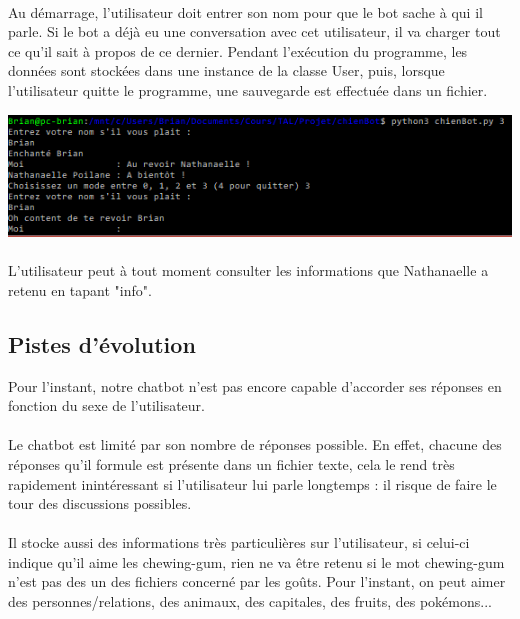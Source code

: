 \documentclass[paper=a4, fontsize=11pt]{article}
\begin{document}
\paragraph{} Au démarrage, l'utilisateur doit entrer son nom pour que le bot sache à qui il parle. Si le bot a déjà eu une conversation avec cet utilisateur, il va charger tout ce qu'il sait à propos de ce dernier. Pendant l'exécution du programme, les données sont stockées dans une instance de la classe User, puis, lorsque l'utilisateur quitte le programme, une sauvegarde est effectuée dans un fichier.
\begin{center}
\includegraphics{reload.PNG}
\end{center}
\paragraph{} 
\paragraph{} L'utilisateur peut à tout moment consulter les informations que Nathanaelle a retenu en tapant "info".

\subsection{Pistes d'évolution}

Pour l'instant, notre chatbot n'est pas encore capable d'accorder ses réponses en fonction du sexe de l'utilisateur.
\paragraph{} Le chatbot est limité par son nombre de réponses possible. En effet, chacune des réponses qu’il formule est présente dans un fichier texte, cela le rend très rapidement inintéressant si l’utilisateur lui parle longtemps : il risque de faire le tour des discussions possibles. 
\paragraph{} Il stocke aussi des informations très particulières sur l’utilisateur, si celui-ci indique qu’il aime les chewing-gum, rien ne va être retenu si le mot chewing-gum n’est pas des un des fichiers concerné par les goûts. Pour l’instant, on peut aimer des personnes/relations, des animaux, des capitales, des fruits, des pokémons...
\end{document}
